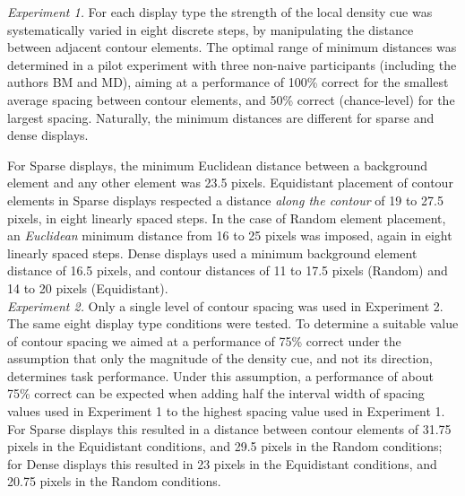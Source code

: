\documentclass[12pt]{article}
\begin{document}
\emph{Experiment 1.} For each display type the strength of the local density cue was systematically varied in eight discrete steps, by manipulating the distance between adjacent contour elements. The optimal range of minimum distances was determined in a pilot experiment with three non-naive participants (including the authors BM and MD), aiming at a performance of 100\% correct for the smallest average spacing between contour elements, and 50\% correct (chance-level) for the largest spacing. Naturally, the minimum distances are different for sparse and dense displays.

For Sparse displays, the minimum Euclidean distance between a background element and any other element was 23.5 pixels. Equidistant placement of contour elements in Sparse displays respected a distance \emph{along the contour} of 19 to 27.5 pixels, in eight linearly spaced steps. In the case of Random element placement, an \emph{Euclidean} minimum distance from 16 to 25 pixels was imposed, again in eight linearly spaced steps. Dense displays used a minimum background element distance of 16.5 pixels, and contour distances of 11 to 17.5 pixels (Random) and 14 to 20 pixels (Equidistant).\\

\emph{Experiment 2.} Only a single level of contour spacing was used in Experiment 2. The same eight display type conditions were tested. To determine a suitable value of contour spacing we aimed at a performance of 75\% correct under the assumption that only the magnitude of the density cue, and not its direction, determines task performance. Under this assumption, a performance of about 75\% correct can be expected when adding half the interval width of spacing values used in Experiment 1 to the highest spacing value used in Experiment 1. For Sparse displays this resulted in a distance between contour elements of 31.75 pixels in the Equidistant conditions, and 29.5 pixels in the Random conditions; for Dense displays this resulted in 23 pixels in the Equidistant conditions, and 20.75 pixels in the Random conditions.
\end{document}
